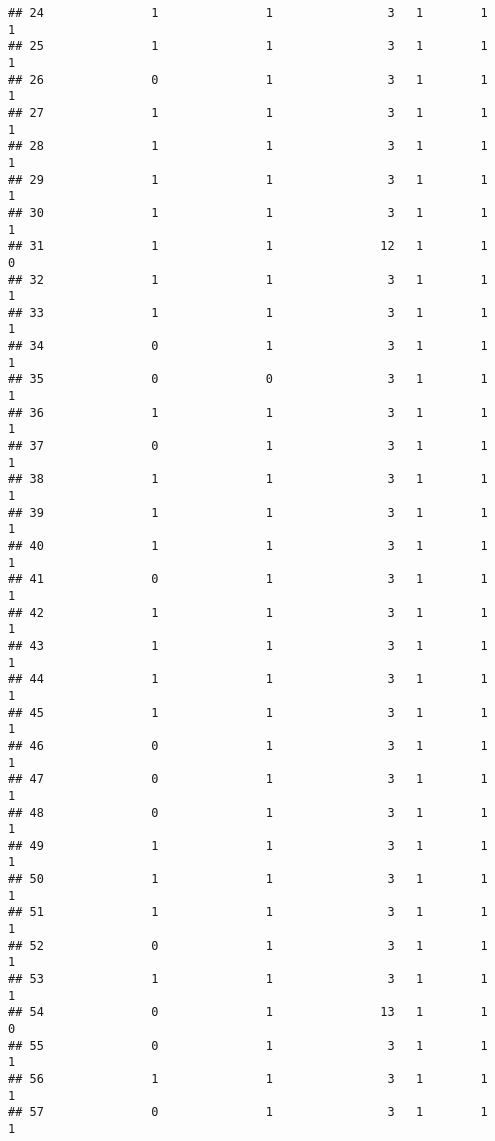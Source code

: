 \documentclass[]{article}
\begin{document}
\begin{verbatim}
## 24               1               1                3   1        1        1
## 25               1               1                3   1        1        1
## 26               0               1                3   1        1        1
## 27               1               1                3   1        1        1
## 28               1               1                3   1        1        1
## 29               1               1                3   1        1        1
## 30               1               1                3   1        1        1
## 31               1               1               12   1        1        0
## 32               1               1                3   1        1        1
## 33               1               1                3   1        1        1
## 34               0               1                3   1        1        1
## 35               0               0                3   1        1        1
## 36               1               1                3   1        1        1
## 37               0               1                3   1        1        1
## 38               1               1                3   1        1        1
## 39               1               1                3   1        1        1
## 40               1               1                3   1        1        1
## 41               0               1                3   1        1        1
## 42               1               1                3   1        1        1
## 43               1               1                3   1        1        1
## 44               1               1                3   1        1        1
## 45               1               1                3   1        1        1
## 46               0               1                3   1        1        1
## 47               0               1                3   1        1        1
## 48               0               1                3   1        1        1
## 49               1               1                3   1        1        1
## 50               1               1                3   1        1        1
## 51               1               1                3   1        1        1
## 52               0               1                3   1        1        1
## 53               1               1                3   1        1        1
## 54               0               1               13   1        1        0
## 55               0               1                3   1        1        1
## 56               1               1                3   1        1        1
## 57               0               1                3   1        1        1

\end{verbatim}
\end{document}
